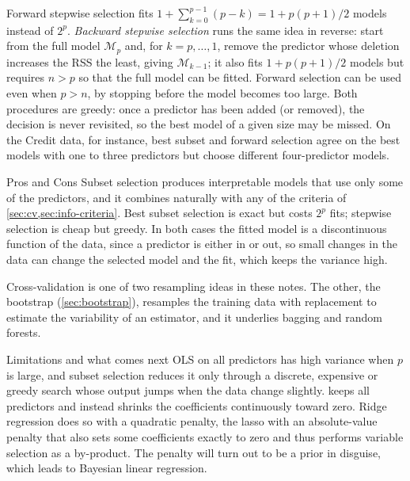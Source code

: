 Forward stepwise selection fits $1+\sum_{k=0}^{p-1}(p-k)=1+p(p+1)/2$ models instead of $2^p$. \emph{Backward stepwise selection} runs the same idea in reverse: start from the full model $\mathcal{M}_p$ and, for $k=p,\dots,1$, remove the predictor whose deletion increases the RSS the least, giving $\mathcal{M}_{k-1}$; it also fits $1+p(p+1)/2$ models but requires $n>p$ so that the full model can be fitted. Forward selection can be used even when $p>n$, by stopping before the model becomes too large. Both procedures are greedy: once a predictor has been added (or removed), the decision is never revisited, so the best model of a given size may be missed. On the Credit data, for instance, best subset and forward selection agree on the best models with one to three predictors but choose different four-predictor models.

\begin{notebox}{Pros and Cons}
Subset selection produces interpretable models that use only some of the predictors, and it combines naturally with any of the criteria of \cref{sec:cv,sec:info-criteria}. Best subset selection is exact but costs $2^p$ fits; stepwise selection is cheap but greedy. In both cases the fitted model is a discontinuous function of the data, since a predictor is either in or out, so small changes in the data can change the selected model and the fit, which keeps the variance high.
\end{notebox}

\begin{remark}
Cross-validation is one of two resampling ideas in these notes. The other, the bootstrap (\cref{sec:bootstrap}), resamples the training data with replacement to estimate the variability of an estimator, and it underlies bagging and random forests.
\end{remark}

\begin{notebox}{Limitations and what comes next}
OLS on all predictors has high variance when $p$ is large, and subset selection reduces it only through a discrete, expensive or greedy search whose output jumps when the data change slightly.  keeps all predictors and instead shrinks the coefficients continuously toward zero. Ridge regression does so with a quadratic penalty, the lasso with an absolute-value penalty that also sets some coefficients exactly to zero and thus performs variable selection as a by-product. The penalty will turn out to be a prior in disguise, which leads to Bayesian linear regression.
\end{notebox}
